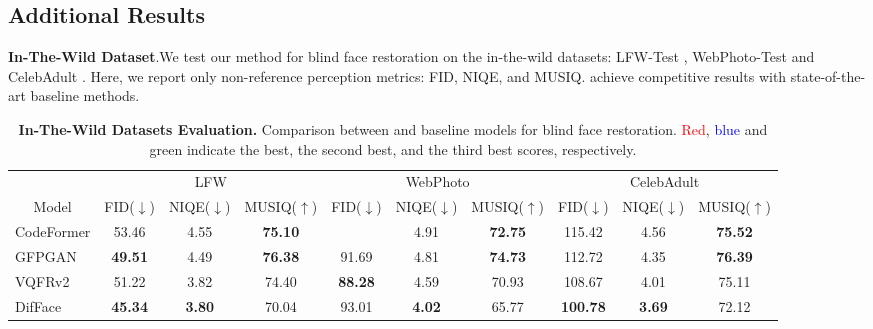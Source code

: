 \newpage
\subsection{Additional Results}\label{apx:results}

\textbf{In-The-Wild Dataset}.\quad We test our method for blind face restoration on the in-the-wild datasets: LFW-Test \cite{LFWTech}, WebPhoto-Test \cite{wang2021towards} and CelebAdult \cite{wang2021towards}. Here, we report only non-reference perception metrics: FID, NIQE, and MUSIQ. \name achieve competitive results with state-of-the-art baseline methods.

\begin{table}[H]
\centering
\footnotesize
\caption{\textbf{In-The-Wild Datasets Evaluation.} Comparison between \name and baseline models for blind face restoration. \textcolor{red}{Red}, \textcolor{blue}{blue} and {\color[HTML]{009901} green} indicate the best, the second best, and the third best scores, respectively.}
\begin{tabular}{lccccccccc}
\toprule
\multicolumn{1}{c}{} & \multicolumn{3}{c}{LFW} & \multicolumn{3}{c}{WebPhoto} & \multicolumn{3}{c}{CelebAdult}  \\ \cmidrule(l){2-4}  \cmidrule(l){5-7} \cmidrule(l){8-10}
\multicolumn{1}{c}{\multirow{-2}{*}{Model}} & FID($\downarrow$) & \multicolumn{1}{l}{NIQE($\downarrow$)} & MUSIQ($\uparrow$) & FID($\downarrow$) & \multicolumn{1}{l}{NIQE($\downarrow$)} & MUSIQ($\uparrow$) & FID($\downarrow$) & \multicolumn{1}{l}{NIQE($\downarrow$)} & MUSIQ($\uparrow$) \\ \midrule\midrule
\cellcolor[HTML]{FFFFFF}CodeFormer & \cellcolor[HTML]{FFFFFF}53.46 & \cellcolor[HTML]{FFFFFF}4.55 &  \textbf{\color[HTML]{009901} 75.10} & \cellcolor[HTML]{FFFFFF}{\color[HTML]{000000} 88.85} & \cellcolor[HTML]{FFFFFF}4.91 &  \textbf{\color[HTML]{009901} 72.75} & 115.42 & 4.56 &  \textbf{\color[HTML]{009901} 75.52} \\
GFPGAN &  \textbf{\color[HTML]{009901} 49.51} & 4.49 &  \textbf{\color[HTML]{3531FF} 76.38} & 91.69 & 4.81 & \textbf{\color[HTML]{FE0000} 74.73} & 112.72 & 4.35 & \textbf{\color[HTML]{FE0000} 76.39} \\
VQFRv2 & 51.22 & 3.82 & 74.40 &  \textbf{\color[HTML]{009901} 88.28} & 4.59 & 70.93 & 108.67 & 4.01 & 75.11 \\
\cellcolor[HTML]{FFFFFF}DifFace & \textbf{\color[HTML]{3531FF} 45.34} &  \textbf{\color[HTML]{009901} 3.80} & \cellcolor[HTML]{FFFFFF}70.04 & \cellcolor[HTML]{FFFFFF}93.01 &  \textbf{\color[HTML]{3531FF} 4.02} & \cellcolor[HTML]{FFFFFF}65.77 & \textbf{\color[HTML]{FE0000} 100.78} &  \textbf{\color[HTML]{009901} 3.69} & 72.12 \\

\end{tabular}
\end{table}
